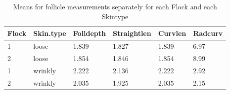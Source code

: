 %

\begin{table}[ht]
\centering
\caption{Means for follicle measurements separately for each Flock and each Skintype}
\label{tab:means}
\vspace{0.1in}
\begin{tabular}{|p{0.5in}|p{0.6in}|p{0.6in}|p{0.6in}|p{0.6in}|p{0.6in}|} \hline
  Flock & Skin.type & Folldepth & Straightlen & Curvlen  & Radcurv\\   
    \hline
  1 & loose & 1.839 & 1.827 & 1.839 & 6.97  \\ 
  2 & loose & 1.854 & 1.846 & 1.854 & 8.99  \\ 
  1 & wrinkly & 2.222 & 2.136 & 2.222 & 2.92 \\ 
  2 & wrinkly & 2.035 & 1.925 & 2.035 & 2.15  \\ 
   \hline
\end{tabular}
\end{table}

%


